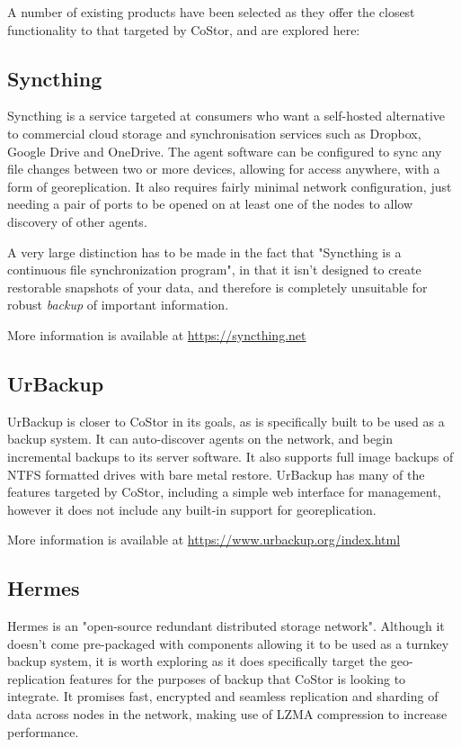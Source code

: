 \documentclass[bsc,frontabs,twoside,singlespacing,parskip,deptreport]{infthesis}     %
\begin{document}
A number of existing products have been selected as they offer the closest functionality
to that targeted by CoStor, and are explored here:

\subsection{Syncthing}

Syncthing is a service targeted at consumers who want a self-hosted alternative to commercial
cloud storage and synchronisation services such as Dropbox, Google Drive and OneDrive. The 
agent software can be configured to sync any file changes between two or more devices, allowing
for access anywhere, with a form of georeplication. It also requires fairly minimal network
configuration, just needing a pair of ports to be opened on at least one of the nodes to allow
discovery of other agents.

A very large distinction has to be made in the fact that "Syncthing is a continuous file 
synchronization program"\cite{syncthing}, in that it isn't designed to create restorable 
snapshots of your data, and therefore is completely unsuitable for robust \textit{backup} of 
important information.

More information is available at \url{https://syncthing.net} \cite{syncthing}

\subsection{UrBackup}

UrBackup is closer to CoStor in its goals, as is specifically built to be used as a backup 
system. It can auto-discover agents on the network, and begin incremental backups to its server
software. It also supports full image backups of NTFS formatted drives with bare metal 
restore. UrBackup has many of the features targeted by CoStor, including a simple web interface
for management, however it does not include any built-in support for georeplication.

More information is available at \url{https://www.urbackup.org/index.html} \cite{urbackup}

\subsection{Hermes}

Hermes is an "open-source redundant distributed storage network"\cite{hermes}. Although it
doesn't come pre-packaged with components allowing it to be used as a turnkey backup system,
it is worth exploring as it does specifically target the geo-replication features for the 
purposes of backup that CoStor is looking to integrate. It promises fast, encrypted and seamless
replication and sharding of data across nodes in the network, making use of LZMA compression
to increase performance.
\end{document}
